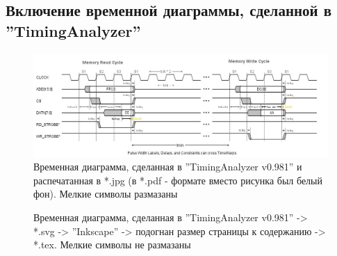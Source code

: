 




\subsection{Включение временной диаграммы, сделанной в ''TimingAnalyzer''}


\begin{figure}[H]\center
  \includegraphics[width=1\textwidth]{./about/TimingAnalyzer/cnstrnt_err_int} %
  \caption{Временная диаграмма, сделанная в ''TimingAnalyzer v0.981'' и распечатанная в *.jpg (в *.pdf - формате вместо рисунка был белый фон). Мелкие символы размазаны} \label{p:time_TimingAnalyzer_1}
\end{figure}






\begin{figure}[H] \centering

\caption{Временная диаграмма, сделанная в ''TimingAnalyzer v0.981'' -> *.svg -> ''Inkscape'' -> подогнан размер страницы к содержанию -> *.tex. Мелкие символы не размазаны}
\label{p:time_TimingAnalyzer_inkscape}
\end{figure}




